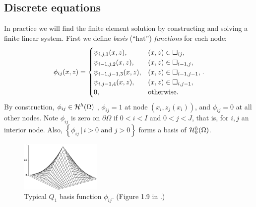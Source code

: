 \documentclass[11pt,final,reqno]{amsart}
\theoremstyle{remark}
\theoremstyle{definition}
\begin{document}
\subsection*{Discrete equations}  In practice we will find the finite element solution by constructing and solving a finite linear system.  First we define \emph{basis} (``hat'') \emph{functions} for each node:
\begin{equation}
     \phi_{ij}(x,z) = \begin{cases}
	                     \psi_{i,j,1}(x,z), & (x,z) \in \square_{ij}, \\
	                     \psi_{i-1,j,2}(x,z), & (x,z) \in \square_{i-1,j}, \\
	                     \psi_{i-1,j-1,3}(x,z), & (x,z) \in \square_{i-1,j-1}, \\
	                     \psi_{i,j-1,4}(x,z), & (x,z) \in \square_{i,j-1}, \\
	                     0, & \text{otherwise}.
	                   \end{cases}.  \label{phiij}
\end{equation}
By construction, $\phi_{ij}\in \mathcal{H}^h_{}(\Omega)$ \cite{Elmanetal2005}, $\phi_{ij}=1$ at node $(x_i,z_j(x_i))$, and $\phi_{ij}=0$ at all other nodes.   Note $\phi_{ij}$ is zero on $\partial \Omega$ if $0<i<I$ and $0<j<J$, that is, for $i,j$ an interior node.  Also, $\left\{\phi_{ij} \,\big|\, i>0 \text{ and } j > 0\right\}$ forms a basis of $\mathcal{H}^h_{0}(\Omega)$.

\begin{figure}[ht] 
\medskip
\includegraphics[width=0.35\textwidth]{figs/chapeau}
\caption{Typical $Q_1$ basis function $\phi_{ij}$.  (Figure 1.9 in \cite{Elmanetal2005}.)}
\label{fig:chapeau}
\end{figure}
\end{document}
